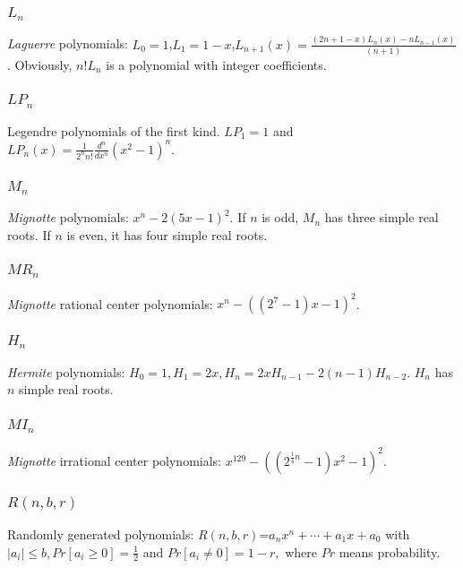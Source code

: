  \subsubsection{$L_n$}
 {\it Laguerre}  polynomials: $L_0=1$,$L_1=1-x$,$L_{n+1}(x)=\frac{  (2n+1-x )L_n(x)-  nL_{n-1 }(x)}{(n+1) }$.
Obviously, $n!L_n$ is a polynomial with integer coefficients.
 \subsubsection{$LP_n$} Legendre polynomials of the first kind. $LP_1=1$ and $LP_n(x)=\frac{1}{2^nn!}\frac{d^n}{dx^n}(x^2-1)^n$.
 \subsubsection{$M_n$} {\it Mignotte} polynomials: $x^n-2(5x-1)^2$. If $n$ is odd, $M_n$ has three simple real roots. If $n$ is even, it has four simple real roots.

\subsubsection{$MR_n$}{\it Mignotte} rational center polynomials: $ x^n-((2^7-1)x-1)^2$.
	
 \subsubsection{$H_n$}{\it Hermite } polynomials:  $H_0=1,H_1=2x,H_n=2xH_{n-1}-2(n-1)H_{n-2}$. $H_n$ has $n$ simple real roots.

 \subsubsection{$MI_n$} {\it Mignotte} irrational center polynomials: $x^{129}-((2^{\frac{1}{4}n}-1)x^2-1)^2$.


 \subsubsection{$R(n,b,r) $} Randomly generated polynomials: $R(n,b,r)$=$a_nx^n+\cdots+a_1x+a_0$ with $|a_i|\le b, Pr[a_i\ge 0]=\frac{1}{2}$ and  $Pr[a_i\neq 0] =1-r,$ where $Pr$ means probability. 



